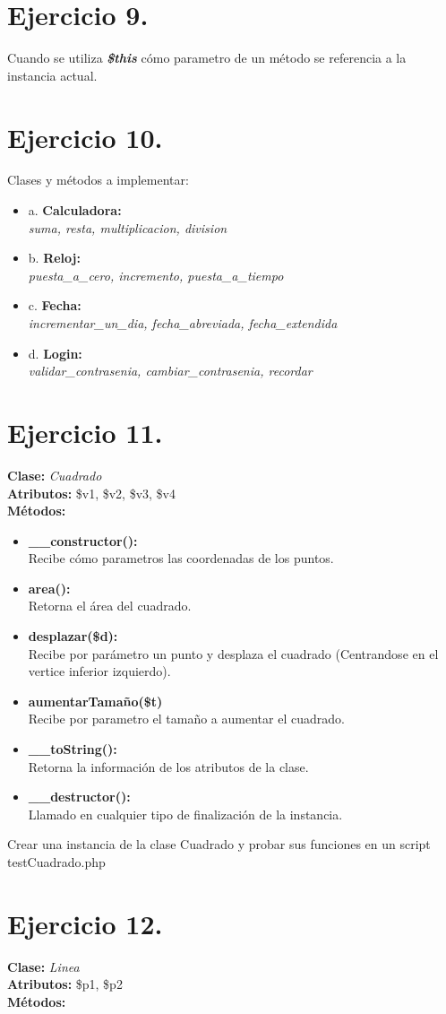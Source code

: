 \documentclass{article}
\begin{document}
\section*{Ejercicio 9.}

Cuando se utiliza \textit{\textbf{\$this}} cómo parametro de un método se referencia
a la instancia actual.

\section*{Ejercicio 10.}

Clases y métodos a implementar:
\begin{itemize}
    \item a. \textbf{Calculadora:} \\\textit{suma, resta, multiplicacion, division}
    \item b. \textbf{Reloj:} \\\textit{puesta\_a\_cero, incremento, puesta\_a\_tiempo}
    \item c. \textbf{Fecha:} \\\textit{incrementar\_un\_dia, fecha\_abreviada, fecha\_extendida}
    \item d. \textbf{Login:} \\\textit{validar\_contrasenia, cambiar\_contrasenia, recordar}
\end{itemize}

\section*{Ejercicio 11.}

\textbf{Clase:} \textit{Cuadrado} \\
\textbf{Atributos:} \$v1, \$v2, \$v3, \$v4 \\
\textbf{Métodos:}
\begin{itemize}
    \item \textbf{\_\_constructor():} \\ Recibe cómo parametros las coordenadas de los puntos.
    \item \textbf{area():} \\ Retorna el área del cuadrado.
    \item \textbf{desplazar(\$d):} \\ Recibe por parámetro un punto y desplaza el cuadrado (Centrandose en el vertice inferior izquierdo).
    \item \textbf{aumentarTamaño(\$t)} \\  Recibe por parametro el tamaño a aumentar el cuadrado.
    \item \textbf{\_\_toString():} \\ Retorna la información de los atributos de la clase.
    \item \textbf{\_\_destructor():}  \\ Llamado en cualquier tipo de finalización de la instancia.
\end{itemize}
    
Crear una instancia de la clase Cuadrado y probar sus funciones en un script testCuadrado.php \par

\section*{Ejercicio 12.}

\textbf{Clase:} \textit{Linea} \\
\textbf{Atributos:} \$p1, \$p2 \\
\textbf{Métodos:}
\end{document}
